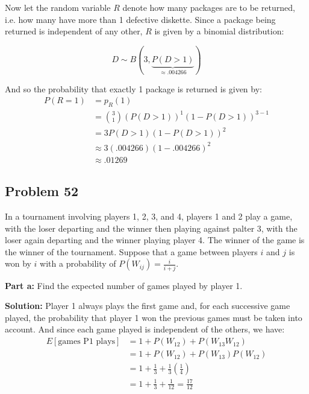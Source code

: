 \documentclass{article}
\begin{document}
Now let the random variable $R$ denote how many packages are to be returned, i.e. how many have more than 1 defective diskette. Since a package being returned is independent of any other, $R$ is given by a binomial distribution:

\begin{equation*}
    D\sim B(3,\underbrace{P(D>1)}_{\approx.004266})
\end{equation*}

And so the probability that exactly 1 package is returned is given by:
\begin{align*}
    P(R=1)&=p_R(1)\tag{def. of pmf}\\
    &=\binom{3}{1}(P(D>1))^1(1-P(D>1))^{3-1}\tag{binomial distribution}\\
    &=3P(D>1)(1-P(D>1))^2\\
    &\approx3(.004266)(1-.004266)^2\\
    &\approx.01269
\end{align*}

\subsection*{Problem 52}
In a tournament involving players 1, 2, 3, and 4, players 1 and 2 play a game, with the loser departing and the winner then playing against palter 3, with the loser again departing and the winner playing player 4. The winner of the game is the winner of the tournament. Suppose that a game between players $i$ and $j$ is won by $i$ with a probability of $P(W_{ij})=\frac{i}{i+j}$.
\bigskip

\noindent\textbf{Part a:} Find the expected number of games played by player 1.
\bigskip

\noindent\textbf{Solution:} Player 1 always plays the first game and, for each successive game played, the probability that player 1 won the previous games must be taken into account. And since each game played is independent of the others, we have:
\begin{align*}
    E[\text{games P1 plays}]&=1+P(W_{12})+P(W_{13}W_{12})\\
    &=1+P(W_{12})+P(W_{13})P(W_{12})\tag{independence}\\
    &=1+\frac{1}{3}+\frac{1}{3}\left(\frac{1}{4}\right)\\
    &=1+\frac{1}{3}+\frac{1}{12}=\frac{17}{12}
\end{align*}
\medskip
\end{document}
